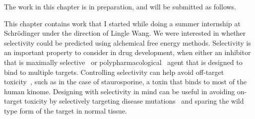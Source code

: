 \documentclass[phd,tocprelim]{cornell}
\begin{document}
The work in this chapter is in preparation, and will be submitted as follows. 
\realsinglespacing
{}

\realdoublespacing
This chapter contains work that I started while doing a summer internship at Schr\"{o}dinger under the direction of Lingle Wang. We were interested in whether selectivity could be predicted using alchemical free energy methods. Selectivity is an important property to consider in drug development, when either an inhibitor that is maximally selective~\citep{Zhang2009-il,Huggins2012-hr} or polypharmacological~\citep{Fan2007-hm,Apsel2008-it,Knight:Nat.Rev.Cancer:2010,Hopkins2006-qu,Hopkins2008-ij} agent that is designed to bind to multiple targets. Controlling selectivity can help avoid off-target toxicity~\citep{Kijima2011-xs,Liu2014-yi}, such as in the case of staurosporine, a toxin that binds to most of the human kinome.  Designing with selectivity in mind can be useful in avoiding on-target toxicity by selectively targeting disease mutations~\citep{Rudmann2013-hi} and sparing the wild type form of the target in normal tissue. 
\end{document}
